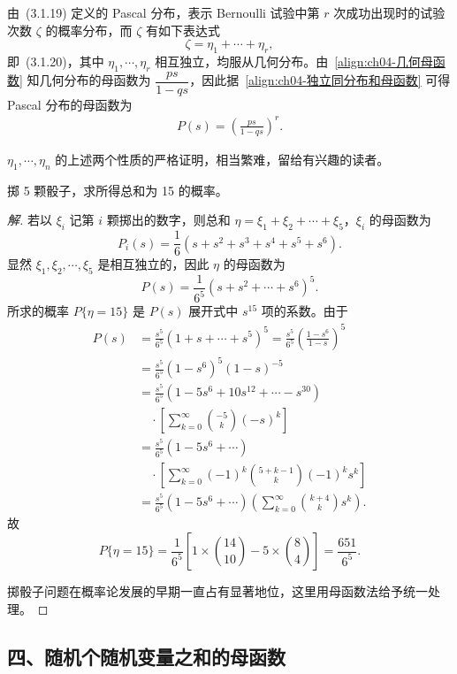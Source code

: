 \documentclass[../../main.tex]{subfiles}
\begin{document}
\begin{example}\label{example:ch04-Pascal母函数}
由~(3.1.19) 定义的 Pascal 分布，表示 Bernoulli 试验中第 $r$ 次成功出现时的试验次数 $\zeta$ 的概率分布，而 $\zeta$ 有如下表达式
\[
\zeta=\eta_1+\cdots+\eta_r,
\]
即~(3.1.20)，其中 $\eta_1,\cdots,\eta_r$ 相互独立，均服从几何分布。由~\eqref{align:ch04-几何母函数} 知几何分布的母函数为 $\dfrac{ps}{1-qs}$，因此据~\eqref{align:ch04-独立同分布和母函数} 可得 Pascal 分布的母函数为
\begin{align}
P(s)=\left(\frac{ps}{1-qs}\right)^r.\label{align:ch04-Pascal母函数}
\end{align}

$\eta_1,\cdots,\eta_n$ 的上述两个性质的严格证明，相当繁难，留给有兴趣的读者。
\end{example}

\begin{example}[掷 5 颗骰子]\label{example:ch04-掷骰子}
掷 5 颗骰子，求所得总和为 15 的概率。
\end{example}

\begin{proof}[解]
若以 $\xi_i$ 记第 $i$ 颗掷出的数字，则总和 $\eta=\xi_1+\xi_2+\cdots+\xi_5$，$\xi_i$ 的母函数为
\[
P_i(s)=\frac16(s+s^2+s^3+s^4+s^5+s^6).
\]
显然 $\xi_1,\xi_2,\cdots,\xi_5$ 是相互独立的，因此 $\eta$ 的母函数为
\[
P(s)=\frac{1}{6^5}(s+s^2+\cdots+s^6)^5.
\]
所求的概率 $P\{\eta=15\}$ 是 $P(s)$ 展开式中 $s^{15}$ 项的系数。由于
\begin{align*}
P(s)&=\frac{s^5}{6^5}(1+s+\cdots+s^5)^5=\frac{s^5}{6^5}\left(\frac{1-s^6}{1-s}\right)^5\\
&=\frac{s^5}{6^5}(1-s^6)^5(1-s)^{-5}\\
&=\frac{s^5}{6^5}(1-5s^6+10s^{12}+\cdots-s^{30})\\
&\quad\cdot\left[\sum_{k=0}^{\infty}\binom{-5}{k}(-s)^k\right]\\
&=\frac{s^5}{6^5}(1-5s^6+\cdots)\\
&\quad\cdot\left[\sum_{k=0}^{\infty}(-1)^k\binom{5+k-1}{k}(-1)^k s^k\right]\\
&=\frac{s^5}{6^5}(1-5s^6+\cdots)\left(\sum_{k=0}^{\infty}\binom{k+4}{k}s^k\right).
\end{align*}
故
\[
P\{\eta=15\}=\frac{1}{6^5}\left[1\times\binom{14}{10}-5\times\binom{8}{4}\right]=\frac{651}{6^5}.
\]

掷骰子问题在概率论发展的早期一直占有显著地位，这里用母函数法给予统一处理。
\end{proof}

\subsection*{四、随机个随机变量之和的母函数}
\end{document}
